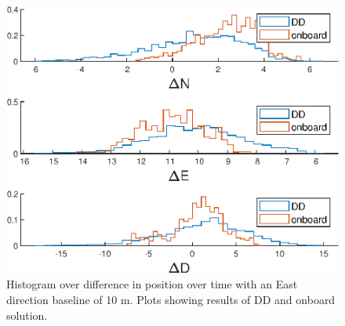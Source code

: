 \begin{figure}[!htb]
\includegraphics[width=\textwidth]{Results/Ehist.eps}
\caption{\label{fig:DDandInternalE} Histogram over difference in position over time with an East direction baseline of 10 m. Plots showing results of DD and onboard solution.}
\end{figure}


